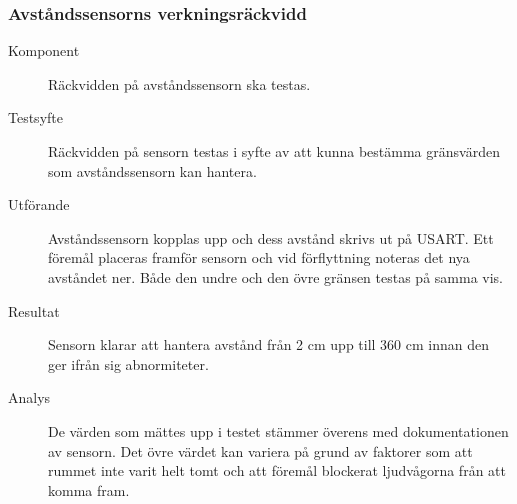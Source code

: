 \documentclass[a4paper]{article}
\begin{document}
\subsubsection{Avståndssensorns verkningsräckvidd}
\label{A:avstand}
\begin{description}
\item[Komponent] Räckvidden på avståndssensorn ska testas.

\item[Testsyfte] Räckvidden på sensorn testas i syfte av att kunna bestämma gränsvärden som avståndssensorn kan hantera.

\item[Utförande] Avståndssensorn kopplas upp och dess avstånd skrivs ut på USART.
Ett föremål placeras framför sensorn och vid förflyttning noteras det nya avståndet ner.
Både den undre och den övre gränsen testas på samma vis. 

\item[Resultat] Sensorn klarar att hantera avstånd från 2 cm upp till 360 cm innan den ger ifrån sig abnormiteter.

\item[Analys] De värden som mättes upp i testet stämmer överens med dokumentationen av sensorn.
Det övre värdet kan variera på grund av faktorer som att rummet inte varit helt tomt och att föremål blockerat ljudvågorna från att komma fram.

\end{description}
\end{document}
